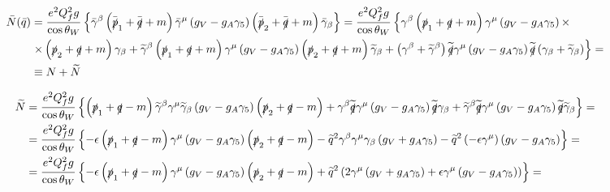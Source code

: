 \begin{align*}
\bar{N} (\bar{q}) & = \frac{e^2Q_f^2g}{\cos\theta_W} \left\lbrace \bar{\gamma}^{\beta} \left( \bar{\slashed{p}}_1 + \bar{\slashed{q}} + m \right) \bar{\gamma}^{\mu} \left( g_V - g_A \gamma_5 \right) \left( \bar{\slashed{p}}_2 + \bar{\slashed{q}} + m \right) \bar{\gamma}_{\beta} \right\rbrace = \frac{e^2Q_f^2g}{\cos\theta_W} \left\lbrace \gamma^{\beta} \left( \slashed{p}_1 + \slashed{q} + m \right) \gamma^{\mu} \left( g_V - g_A \gamma_5 \right) \times \right. & \\
& \left. \times \left( \slashed{p}_2 + \slashed{q} + m \right) \gamma_{\beta} + \widetilde{\gamma}^{\beta} \left( \slashed{p}_1 + \slashed{q} + m \right) \gamma^{\mu} \left( g_V - g_A \gamma_5 \right) \left( \slashed{p}_2 + \slashed{q} + m \right) \widetilde{\gamma}_{\beta} + \left( \gamma^{\beta} + \widetilde{\gamma}^{\beta} \right) \widetilde{\slashed{q}} \gamma^{\mu} \left( g_V - g_A \gamma_5 \right) \widetilde{\slashed{q}} \left( \gamma_{\beta} + \widetilde{\gamma}_{\beta} \right) \right\rbrace = & \\
& \equiv N + \widetilde{N} &
\end{align*}

\begin{align*}
\widetilde{N} & = \frac{e^2Q_f^2g}{\cos\theta_W} \left\lbrace \left( \slashed{p}_1 + \slashed{q} - m \right) \widetilde{\gamma}^{\beta} \gamma^{\mu} \widetilde{\gamma}_{\beta} \left( g_V - g_A \gamma_5 \right) \left( \slashed{p}_2 + \slashed{q} - m \right) + \gamma^{\beta} \widetilde{\slashed{q}} \gamma^{\mu} \left( g_V - g_A \gamma_5 \right) \widetilde{\slashed{q}} \gamma_{\beta} + \widetilde{\gamma}^{\beta} \widetilde{\slashed{q}} \gamma^{\mu} \left( g_V - g_A \gamma_5 \right) \widetilde{\slashed{q}} \widetilde{\gamma}_{\beta}   \right\rbrace = & \\
& = \frac{e^2Q_f^2g}{\cos\theta_W} \left\lbrace -\epsilon \left( \slashed{p}_1 + \slashed{q} - m \right) \gamma^{\mu} \left( g_V - g_A \gamma_5 \right) \left( \slashed{p}_2 + \slashed{q} - m \right) - \widetilde{q}^2 \gamma^{\beta}\gamma^{\mu}\gamma_{\beta} \left( g_V + g_A \gamma_5 \right) - \widetilde{q}^2 \left( -\epsilon \gamma^{\mu} \right) \left( g_V - g_A \gamma_5 \right) \right\rbrace = & \\
& = \frac{e^2Q_f^2g}{\cos\theta_W} \left\lbrace -\epsilon \left( \slashed{p}_1 + \slashed{q} - m \right) \gamma^{\mu} \left( g_V - g_A \gamma_5 \right) \left( \slashed{p}_2 + \slashed{q} - m \right) + \widetilde{q}^2 \left( 2 \gamma^{\mu} \left( g_V + g_A \gamma_5 \right) + \epsilon \gamma^{\mu} \left( g_V - g_A \gamma_5 \right) \right) \right\rbrace = &
\end{align*}

